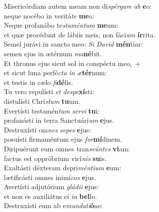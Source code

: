 \oddverse Misericórdiam autem meam non di\textit{spér}\textit{gam} \textit{ab} \textbf{e}o:~\*\\
\oddverse neque nocébo in veritá\textit{te} \textbf{me}a:\\
\evenverse Neque profanábo te\textit{sta}\textit{mén}\textit{tum} \textbf{me}um:~\*\\
\evenverse et quæ procédunt de lábiis meis, non fáci\textit{am} \textbf{ír}rita.\\
\oddverse Semel jurávi in sancto meo: \textit{Si} \textit{Da}\textit{vid} \textbf{mén}tiar:~\*\\
\oddverse semen ejus in ætérnum \textit{ma}\textbf{né}bit.\\
\evenverse Et thronus ejus sicut sol in conspéctu meo,~+\\
\evenverse  et sicut luna perfé\textit{cta} \textit{in} \textit{æ}\textbf{tér}num:~\*\\
\evenverse et testis in cælo \textit{fi}\textbf{dé}lis.\\
\oddverse Tu vero repulísti \textit{et} \textit{de}\textit{spe}\textbf{xí}sti:~\*\\
\oddverse distulísti Chri\textit{stum} \textbf{tu}um.\\
\evenverse Evertísti testamén\textit{tum} \textit{ser}\textit{vi} \textbf{tu}i:~\*\\
\evenverse profanásti in terra Sanctuári\textit{um} \textbf{e}jus.\\
\oddverse Destruxísti om\textit{nes} \textit{se}\textit{pes} \textbf{e}jus:~\*\\
\oddverse posuísti firmaméntum ejus \textit{for}\textbf{mí}dinem.\\
\evenverse Diripuérunt eum omnes tran\textit{se}\textit{ún}\textit{tes} \textbf{vi}am:~\*\\
\evenverse factus est oppróbrium vicí\textit{nis} \textbf{su}is.\\
\oddverse Exaltásti déxteram depri\textit{mén}\textit{ti}\textit{um} \textbf{e}um:~\*\\
\oddverse lætificásti omnes inimí\textit{cos} \textbf{e}jus.\\
\evenverse Avertísti adjutórium \textit{glá}\textit{di}\textit{i} \textbf{e}jus:~\*\\
\evenverse et non es auxiliátus ei \textit{in} \textbf{bel}lo.\\
\oddverse Destruxísti eum ab e\textit{mun}\textit{da}\textit{ti}\textbf{ó}ne:~\*\\
